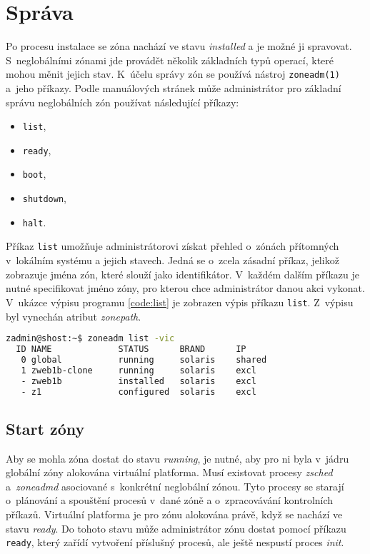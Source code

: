 \section{Správa}
\label{chapter:zones:management}
Po procesu instalace se zóna nachází ve stavu \textit{installed} a je možné ji spravovat. S~neglobálními zónami jde provádět
několik základních typů operací, které mohou měnit jejich stav. K~účelu správy zón se používá nástroj \verb|zoneadm(1)|
a~jeho příkazy. Podle manuálových stránek \cite{oracle:manpages:zoneadm} může administrátor pro základní správu neglobálních
zón používat následující příkazy:
\begin{itemize}
 \item \verb|list|,
 \item \verb|ready|,
 \item \verb|boot|,
 \item \verb|shutdown|,
 \item \verb|halt|.
\end{itemize}
Příkaz \verb|list| umožňuje administrátorovi získat přehled o~zónách přítomných v~lokálním systému a jejich stavech. Jedná
se o~zcela zásadní příkaz, jelikož zobrazuje jména zón, které slouží jako identifikátor. V~každém dalším příkazu je nutné 
specifikovat jméno zóny, pro kterou chce administrátor danou akci vykonat. V~ukázce výpisu programu \ref{code:list} je zobrazen
výpis příkazu \verb|list|. Z~výpisu byl vynechán atribut \textit{zonepath}.
\begin{lstlisting}[language=bash, caption={Výpis příkazu zoneadm list}, float, label={code:list}]
zadmin@shost:~$ zoneadm list -vic
  ID NAME             STATUS      BRAND      IP    
   0 global           running     solaris    shared
   1 zweb1b-clone     running     solaris    excl     
   - zweb1b           installed   solaris    excl  
   - z1               configured  solaris    excl  
\end{lstlisting}
\subsection{Start zóny}
\label{chapter:zones:management:start}
Aby se mohla zóna dostat do stavu \textit{running}, je nutné, aby pro ni byla v~jádru globální zóny alokována virtuální platforma.
Musí existovat procesy \textit{zsched} a~\textit{zoneadmd} asociované s~konkrétní neglobální zónou. Tyto procesy
se starají o~plánování a spouštění procesů v~dané zóně a o~zpracovávání kontrolních příkazů. Virtuální platforma je pro zónu
alokována právě, když se nachází ve stavu \textit{ready}. Do tohoto stavu může administrátor zónu dostat pomocí příkazu 
\verb|ready|, který zařídí vytvoření příslušný procesů, ale ještě nespustí proces \textit{init}.

